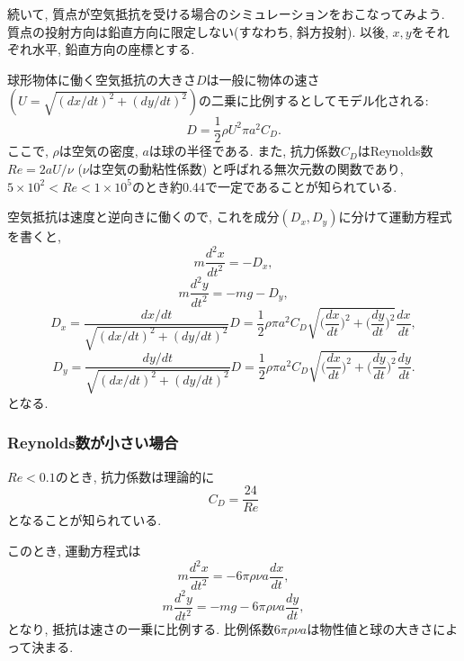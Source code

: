 \documentclass[a4j]{jsarticle}
\begin{document}
続いて, 質点が空気抵抗を受ける場合のシミュレーションをおこなってみよう. 
質点の投射方向は鉛直方向に限定しない(すなわち, 斜方投射). 
以後, $x, y$をそれぞれ水平, 鉛直方向の座標とする. 


球形物体に働く空気抵抗の大きさ$D$は一般に物体の速さ$(U=\sqrt{(dx/dt)^2+(dy/dt)^2})$の二乗に比例するとしてモデル化される: 
\begin{equation}
D=\frac{1}{2}\rho U^2 \pi a^2 C_D. 
\end{equation}
ここで, $\rho$は空気の密度, $a$は球の半径である. 
また, 抗力係数$C_D$はReynolds数$Re=2aU/\nu$ ($\nu$は空気の動粘性係数)
と呼ばれる無次元数の関数であり, 
$5 \times 10^2 < Re < 1 \times 10^5$のとき約0.44で一定であることが知られている.  

空気抵抗は速度と逆向きに働くので, これを成分$(D_x, D_y)$に分けて運動方程式を書くと, 
\begin{equation}
m\frac{d^2 x}{dt^2}=-D_x, 
\end{equation}
\begin{equation}
m\frac{d^2 y}{dt^2}=-mg-D_y, 
\end{equation}
\begin{equation}
D_x=\frac{dx/dt}{\sqrt{(dx/dt)^2+(dy/dt)^2}}D=\frac{1}{2}\rho \pi a^2 C_D\sqrt{\Big(\frac{dx}{dt}\Big)^2+\Big(\frac{dy}{dt}\Big)^2}\frac{dx}{dt}, 
\end{equation}
\begin{equation}
D_y=\frac{dy/dt}{\sqrt{(dx/dt)^2+(dy/dt)^2}}D=\frac{1}{2}\rho \pi a^2 C_D\sqrt{\Big(\frac{dx}{dt}\Big)^2+\Big(\frac{dy}{dt}\Big)^2}\frac{dy}{dt}. 
\end{equation}
となる. 

\subsubsection{Reynolds数が小さい場合}
$Re<0.1$のとき, 抗力係数は理論的に
\begin{equation}
C_D=\frac{24}{Re}
\end{equation}
となることが知られている. 

このとき, 運動方程式は
\begin{equation}
m\frac{d^2 x}{dt^2}=-6\pi \rho \nu a \frac{dx}{dt}, 
\end{equation}
\begin{equation}
m\frac{d^2 y}{dt^2}=-mg-6\pi \rho \nu a \frac{dy}{dt}, 
\end{equation}
となり, 抵抗は速さの一乗に比例する. 
比例係数$6\pi \rho \nu a$は物性値と球の大きさによって決まる. 
\end{document}
